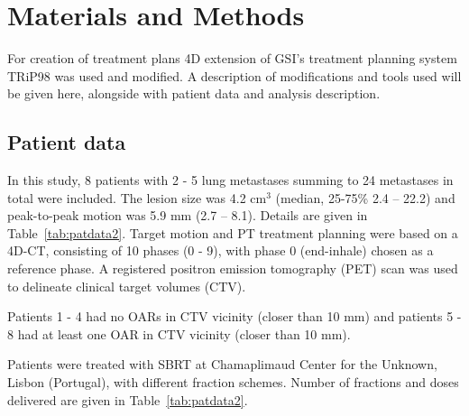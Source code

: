 \documentclass[type=dr, dr=rernat, accentcolor=tud7b,colorbacktitle, bigchapter, openright, twoside, 12pt ]{tudthesis}
\begin{document}
\section{Materials and Methods}

For creation of treatment plans 4D extension of GSI's treatment planning system TRiP98 \cite{Kraemer2000a, Richter2013} was used and modified. A description of modifications and tools used will be given here, 
alongside with patient data and analysis description.

\subsection{Patient data}


In this study, 8 patients with 2 - 5 lung metastases summing to 24 metastases in total were included. The lesion size was 4.2 cm$^3$ (median, 25-75\% 2.4 – 22.2) and peak-to-peak motion was 5.9 mm (2.7 – 8.1). Details are given in Table~\ref{tab:patdata2}.
Target motion and PT treatment planning were based on a 4D-CT, consisting of 10 phases (0 - 9), with phase 0 (end-inhale) chosen as a reference phase.
A registered positron emission tomography (PET) scan was used to delineate clinical target volumes (CTV). 

Patients 1 - 4 had no OARs in CTV vicinity (closer than 10 mm) and patients 5 - 8 had at least one OAR in CTV vicinity (closer than 10 mm).

Patients were treated with SBRT at Chamaplimaud Center for the Unknown, Lisbon (Portugal), with different fraction schemes. Number of fractions and doses delivered are given in Table~\ref{tab:patdata2}. 
\end{document}
